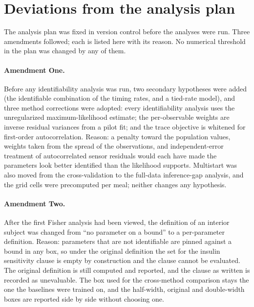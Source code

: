\section{Deviations from the analysis plan}
\label{app:deviations}

The analysis plan was fixed in version control before the analyses were run. Three amendments followed;
each is listed here with its reason. No numerical threshold in the plan was changed by any of them.

\paragraph{Amendment One.}
Before any identifiability analysis was run, two secondary hypotheses were added (the identifiable
combination of the timing rates, and a tied-rate model), and three method corrections were adopted:
every identifiability analysis uses the unregularized maximum-likelihood estimate; the per-observable
weights are inverse residual variances from a pilot fit; and the trace objective is whitened for
first-order autocorrelation. Reason: a penalty toward the population values, weights taken from the
spread of the observations, and independent-error treatment of autocorrelated sensor residuals would each
have made the parameters look better identified than the likelihood supports. Multistart was also moved
from the cross-validation to the full-data inference-gap analysis, and the grid cells were
precomputed per meal; neither changes any hypothesis.

\paragraph{Amendment Two.}
After the first Fisher analysis had been viewed, the definition of an interior subject was changed from
``no parameter on a bound'' to a per-parameter definition. Reason: parameters that are not identifiable
are pinned against a bound in any box, so under the original definition the set for the insulin
sensitivity clause is empty by construction and the clause cannot be evaluated. The original definition is
still computed and reported, and the clause as written is recorded as unevaluable. The box used for the
cross-method comparison stays the one the baselines were trained on, and the half-width, original and double-width boxes are
reported side by side without choosing one.

